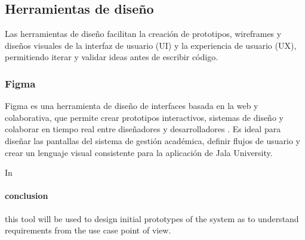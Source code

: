 \subsection{Herramientas de diseño}
Las herramientas de diseño facilitan la creación de prototipos, wireframes y diseños visuales de la interfaz de usuario (UI) y la experiencia de usuario (UX), permitiendo iterar y validar ideas antes de escribir código.

\subsubsection{Figma}
Figma es una herramienta de diseño de interfaces basada en la web y colaborativa, que permite crear prototipos interactivos, sistemas de diseño y colaborar en tiempo real entre diseñadores y desarrolladores \parencite{Figma}.
Es ideal para diseñar las pantallas del sistema de gestión académica, definir flujos de usuario y crear un lenguaje visual consistente para la aplicación de Jala University.

In \paragraph{conclusion} this tool will be used to design initial prototypes of the system as to understand requirements from the use case point of view.
